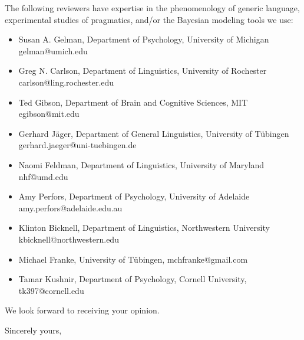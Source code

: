 \documentclass[11pt,letterpaper]{letter} %
\begin{document}
\begin{letter}
The following reviewers have expertise in the phenomenology of generic language, experimental studies of pragmatics, and/or the Bayesian modeling tools we use:

\begin{itemize}
\item Susan A. Gelman, Department of Psychology, University of Michigan gelman@umich.edu
\item Greg N. Carlson, Department of Linguistics, University of Rochester carlson@ling.rochester.edu
\item Ted Gibson, Department of Brain and Cognitive Sciences, MIT egibson@mit.edu
\item Gerhard J{\"a}ger, Department of General Linguistics, University of T{\"u}bingen gerhard.jaeger@uni-tuebingen.de
\item Naomi Feldman, Department of Linguistics, University of Maryland nhf@umd.edu
\item Amy Perfors, Department of Psychology, University of Adelaide amy.perfors@adelaide.edu.au
\item Klinton Bicknell, Department of Linguistics, Northwestern University kbicknell@northwestern.edu
\item Michael Franke, University of T{\"u}bingen, mchfranke@gmail.com
\item Tamar Kushnir, Department of Psychology, Cornell University, tk397@cornell.edu
\end{itemize}

We look forward to receiving your opinion.


\closing{Sincerely yours,}

\end{letter}
\end{document}
